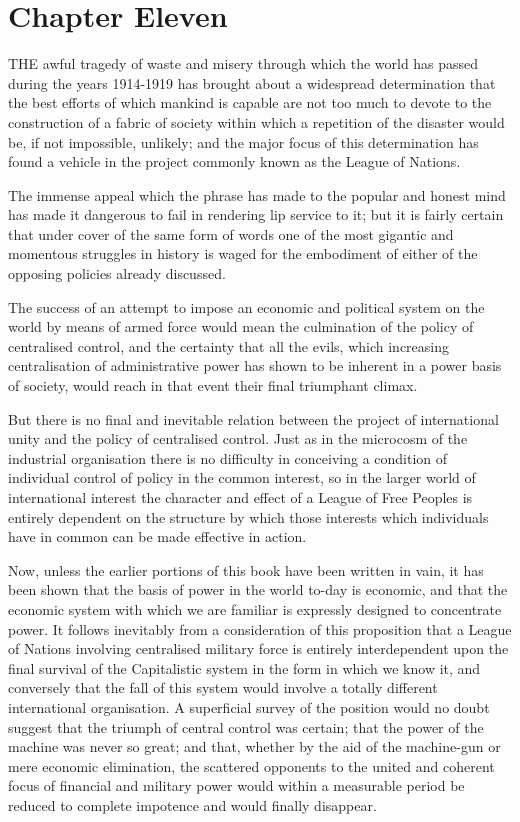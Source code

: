 \documentclass{book}
\begin{document}
\chapter{Chapter Eleven}
\label{chapter-11}
THE awful tragedy of waste and misery through which the world has passed during the years 1914-1919 has brought about a widespread determination that the best efforts of which mankind is capable are not too much to devote to the construction of a fabric of society within which a repetition of the disaster would be, if not impossible, unlikely; and the major focus of this determination has found a vehicle in the project commonly known as the League of Nations.

The immense appeal which the phrase has made to the popular and honest mind has made it dangerous to fail in rendering lip service to it; but it is fairly certain that under cover of the same form of words one of the most gigantic and momentous struggles in history is waged for the embodiment of either of the opposing policies already discussed.

The success of an attempt to impose an economic and political system on the world by means of armed force would mean the culmination of the policy of centralised control, and the certainty that all the evils, which increasing centralisation of administrative power has shown to be inherent in a power basis of society, would reach in that event their final triumphant climax.

But there is no final and inevitable relation between the project of international unity and the policy of centralised control. Just as in the microcosm of the industrial organisation there is no difficulty in conceiving a condition of individual control of policy in the common interest, so in the larger world of international interest the character and effect of a League of Free Peoples is entirely dependent on the structure by which those interests which individuals have in common can be made effective in action.

Now, unless the earlier portions of this book have been written in vain, it has been shown that the basis of power in the world to-day is economic, and that the economic system with which we are familiar is expressly designed to concentrate power. It follows inevitably from a consideration of this proposition that a League of Nations involving centralised military force is entirely interdependent upon the final survival of the Capitalistic system in the form in which we know it, and conversely that the fall of this system would involve a totally different international organisation. A superficial survey of the position would no doubt suggest that the triumph of central control was certain; that the power of the machine was never so great; and that, whether by the aid of the machine-gun or mere economic elimination, the scattered opponents to the united and coherent focus of financial and military power would within a measurable period be reduced to complete impotence and would finally disappear.
\end{document}
